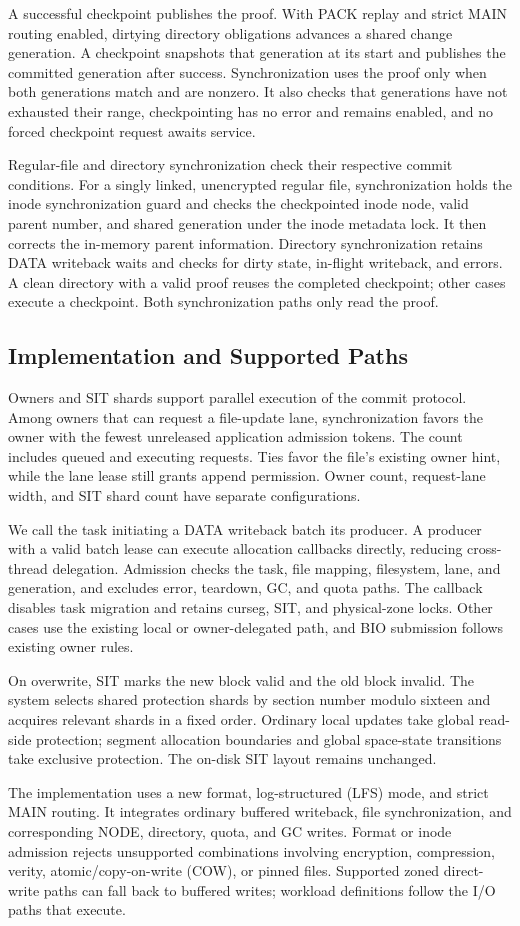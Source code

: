 A successful checkpoint publishes the proof.
With PACK replay and strict MAIN routing enabled, dirtying directory obligations advances a shared change generation.
A checkpoint snapshots that generation at its start and publishes the committed generation after success.
Synchronization uses the proof only when both generations match and are nonzero.
It also checks that generations have not exhausted their range, checkpointing has no error and remains enabled, and no forced checkpoint request awaits service.

Regular-file and directory synchronization check their respective commit conditions.
For a singly linked, unencrypted regular file, synchronization holds the inode synchronization guard and checks the checkpointed inode node, valid parent number, and shared generation under the inode metadata lock.
It then corrects the in-memory parent information.
Directory synchronization retains DATA writeback waits and checks for dirty state, in-flight writeback, and errors.
A clean directory with a valid proof reuses the completed checkpoint; other cases execute a checkpoint.
Both synchronization paths only read the proof.

\subsection{Implementation and Supported Paths}\label{sec:implementation}
Owners and SIT shards support parallel execution of the commit protocol.
Among owners that can request a file-update lane, synchronization favors the owner with the fewest unreleased application admission tokens.
The count includes queued and executing requests.
Ties favor the file's existing owner hint, while the lane lease still grants append permission.
Owner count, request-lane width, and SIT shard count have separate configurations.

We call the task initiating a DATA writeback batch its producer.
A producer with a valid batch lease can execute allocation callbacks directly, reducing cross-thread delegation.
Admission checks the task, file mapping, filesystem, lane, and generation, and excludes error, teardown, GC, and quota paths.
The callback disables task migration and retains curseg, SIT, and physical-zone locks.
Other cases use the existing local or owner-delegated path, and BIO submission follows existing owner rules.

On overwrite, SIT marks the new block valid and the old block invalid.
The system selects shared protection shards by section number modulo sixteen and acquires relevant shards in a fixed order.
Ordinary local updates take global read-side protection; segment allocation boundaries and global space-state transitions take exclusive protection.
The on-disk SIT layout remains unchanged.

The implementation uses a new format, log-structured (LFS) mode, and strict MAIN routing.
It integrates ordinary buffered writeback, file synchronization, and corresponding NODE, directory, quota, and GC writes.
Format or inode admission rejects unsupported combinations involving encryption, compression, verity, atomic/copy-on-write (COW), or pinned files.
Supported zoned direct-write paths can fall back to buffered writes; workload definitions follow the I/O paths that execute.
